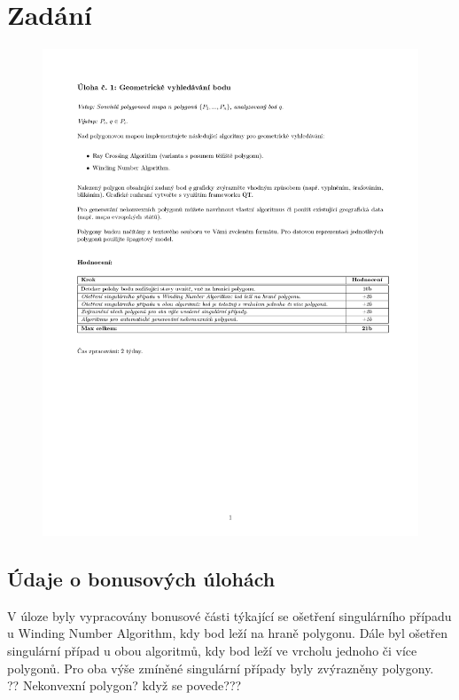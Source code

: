 \documentclass[a4paper, 12pt]{article}
\begin{document}
\section{Zadání}
\begin{figure}[h!]
	\centering
	\includegraphics[clip, trim=0cm 10cm 0cm 3cm, width=1.2\textwidth]{zadani.pdf}
\end{figure}

\subsection{Údaje o bonusových úlohách}
V úloze byly vypracovány bonusové části týkající se ošetření singulárního případu u Winding Number Algorithm, kdy bod leží na hraně polygonu. Dále byl ošetřen singulární případ u obou algoritmů, kdy bod leží ve vrcholu jednoho či více polygonů. Pro oba výše zmíněné singulární případy byly zvýrazněny polygony. \\

?? Nekonvexní polygon? když se povede???
\end{document}
